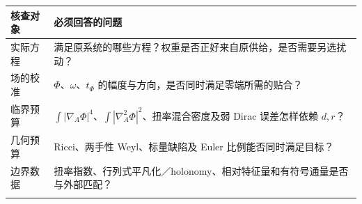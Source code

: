 \documentclass[
  10pt,
]{article}
\begin{document}
\begin{longtable}[]{@{}>{\raggedright\arraybackslash}p{\dimexpr(\linewidth-2\tabcolsep)/2\relax}>{\raggedright\arraybackslash}p{\dimexpr(\linewidth-2\tabcolsep)/2\relax}@{}}
\toprule
\begin{minipage}[b]{0.47\columnwidth}\raggedright
核查对象\strut
\end{minipage} & \begin{minipage}[b]{0.47\columnwidth}\raggedright
必须回答的问题\strut
\end{minipage}\tabularnewline
\midrule
\endhead
\begin{minipage}[t]{0.47\columnwidth}\raggedright
实际方程\strut
\end{minipage} & \begin{minipage}[t]{0.47\columnwidth}\raggedright
满足原系统的哪些方程？权重是否正好来自原供给，是否需要另选扰动？\strut
\end{minipage}\tabularnewline
\begin{minipage}[t]{0.47\columnwidth}\raggedright
场的校准\strut
\end{minipage} & \begin{minipage}[t]{0.47\columnwidth}\raggedright
\(\Phi\)、\(\omega\)、\(t_\Phi\)
的幅度与方向，是否同时满足零端所需的贴合？\strut
\end{minipage}\tabularnewline
\begin{minipage}[t]{0.47\columnwidth}\raggedright
临界预算\strut
\end{minipage} & \begin{minipage}[t]{0.47\columnwidth}\raggedright
\(\int|\nabla_A\Phi|^4\)、\(\int|\nabla_A^2\Phi|^2\)、扭率混合密度及弱
Dirac 误差怎样依赖 \(d,r\)？\strut
\end{minipage}\tabularnewline
\begin{minipage}[t]{0.47\columnwidth}\raggedright
几何预算\strut
\end{minipage} & \begin{minipage}[t]{0.47\columnwidth}\raggedright
Ricci、两手性 Weyl、标量缺陷及 Euler 比例能否同时满足目标？\strut
\end{minipage}\tabularnewline
\begin{minipage}[t]{0.47\columnwidth}\raggedright
边界数据\strut
\end{minipage} & \begin{minipage}[t]{0.47\columnwidth}\raggedright
扭率指数、行列式平凡化／holonomy、相对特征量和有符号通量是否与外部匹配？\strut
\end{minipage}\tabularnewline
\begin{minipage}[t]{0.47\columnwidth}\raggedright

\end{minipage}
\end{longtable}
\end{document}
